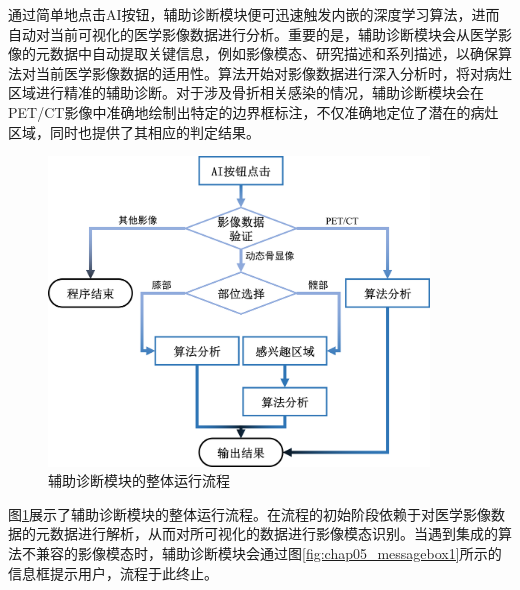 通过简单地点击AI按钮，辅助诊断模块便可迅速触发内嵌的深度学习算法，进而自动对当前可视化的医学影像数据进行分析。重要的是，辅助诊断模块会从医学影像的元数据中自动提取关键信息，例如影像模态、研究描述和系列描述，以确保算法对当前医学影像数据的适用性。算法开始对影像数据进行深入分析时，将对病灶区域进行精准的辅助诊断。对于涉及骨折相关感染的情况，辅助诊断模块会在PET/CT影像中准确地绘制出特定的边界框标注，不仅准确地定位了潜在的病灶区域，同时也提供了其相应的判定结果。

\begin{figure}[htbp]
    \centering
    \includegraphics[width=0.9\textwidth]{figures/chap05_diagnose.png}
    \caption{辅助诊断模块的整体运行流程}
    \label{fig:chap05_diagnose}
\end{figure}

图\ref{fig:chap05_diagnose}展示了辅助诊断模块的整体运行流程。在流程的初始阶段依赖于对医学影像数据的元数据进行解析，从而对所可视化的数据进行影像模态识别。当遇到集成的算法不兼容的影像模态时，辅助诊断模块会通过图\ref{fig:chap05_messagebox1}所示的信息框提示用户，流程于此终止。

